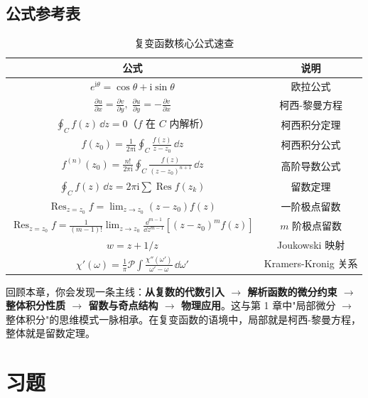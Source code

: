 \subsection*{公式参考表}

\begin{table}[h]
\centering
\caption{复变函数核心公式速查}
\label{tab:complex_formulas}
\begin{tabular}{c|c}
\toprule
公式 & 说明 \\
\midrule
$e^{\mathrm{i}\theta} = \cos\theta + \mathrm{i}\sin\theta$ & 欧拉公式 \\
$\frac{\partial u}{\partial x} = \frac{\partial v}{\partial y},\; \frac{\partial u}{\partial y} = -\frac{\partial v}{\partial x}$ & 柯西-黎曼方程 \\
$\oint_C f(z)\,\dd z = 0$（$f$ 在 $C$ 内解析） & 柯西积分定理 \\
$f(z_0) = \frac{1}{2\pi\mathrm{i}}\oint_C \frac{f(z)}{z-z_0}\,\dd z$ & 柯西积分公式 \\
$f^{(n)}(z_0) = \frac{n!}{2\pi\mathrm{i}}\oint_C \frac{f(z)}{(z-z_0)^{n+1}}\,\dd z$ & 高阶导数公式 \\
$\oint_C f(z)\,\dd z = 2\pi\mathrm{i}\sum\mathop{\mathrm{Res}} f(z_k)$ & 留数定理 \\
$\mathop{\mathrm{Res}}_{z=z_0} f = \lim_{z\to z_0}(z-z_0)f(z)$ & 一阶极点留数 \\
$\mathop{\mathrm{Res}}_{z=z_0} f = \frac{1}{(m-1)!}\lim_{z\to z_0}\frac{\dd^{m-1}}{\dd z^{m-1}}[(z-z_0)^m f(z)]$ & $m$ 阶极点留数 \\
$w = z + 1/z$ & Joukowski 映射 \\
$\chi'(\omega) = \frac{1}{\pi}\mathcal{P}\int\frac{\chi''(\omega')}{\omega'-\omega}\,\dd\omega'$ & Kramers-Kronig 关系 \\
\bottomrule
\end{tabular}
\end{table}

\begin{insight}
回顾本章，你会发现一条主线：\textbf{从复数的代数引入 $\to$ 解析函数的微分约束 $\to$ 整体积分性质 $\to$ 留数与奇点结构 $\to$ 物理应用}。这与第 1 章中"局部微分 $\to$ 整体积分"的思维模式一脉相承。在复变函数的语境中，局部就是柯西-黎曼方程，整体就是留数定理。
\end{insight}

\section*{习题}

